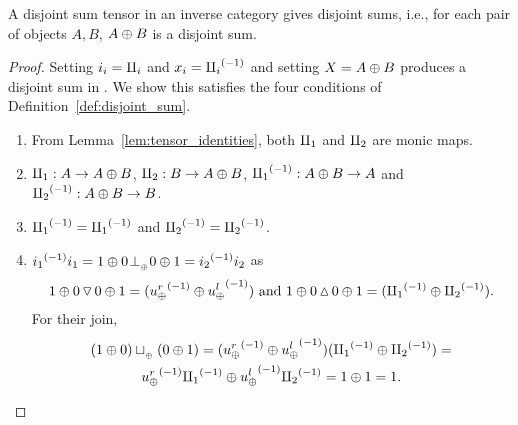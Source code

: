 \begin{proposition}\label{prop:a_disjoint_sum_tensor_gives_disjoint_sums}
  A disjoint sum tensor in an inverse category \X gives disjoint sums, i.e., for each pair of
  objects $A,B$, $A\oplus B$ is a disjoint sum.
\end{proposition}
\begin{proof}
  Setting $i_i = \amalg_{i}$ and $x_i = {\amalg_{i}}^{(-1)}$ and setting $X = A\oplus B$ produces a disjoint
  sum in \X. We show this satisfies the four conditions of Definition~\ref{def:disjoint_sum}.
  \begin{enumerate}[{(}i{)}]
    \item From Lemma~\ref{lem:tensor_identities}, both $\amalg_{1}$ and $\amalg_{2}$ are monic maps.
    \item $\amalg_{1} : A \to A\oplus B$, $\amalg_{2}: B \to A\oplus B$, ${\amalg_{1}}^{(-1)}: A\oplus B \to A$ and ${\amalg_{2}}^{(-1)}: A\oplus B \to B$.
    \item ${\amalg_{1}}^{(-1)} = {\amalg_{1}}^{(-1)}$ and ${\amalg_{2}}^{(-1)} = {\amalg_{2}}^{(-1)}$.
    \item ${i_1}^{(-1)}i_1 = 1\oplus 0 {}_{{}_{}}{\perp_{{}_{\oplus}}} 0\oplus1 = {i_2}^{(-1)}i_2$ as
      \[
        1\oplus0 \operatorname{\triangledown} 0\oplus1 = ({u_{\oplus}^r}^{(-1)}\oplus{\ensuremath{u_{\oplus}^l}}^{(-1)})\text{ and }
        1\oplus0 \operatorname{\vartriangle} 0\oplus1 = ({\amalg_{1}}^{(-1)}\oplus{\amalg_{2}}^{(-1)}).
      \]
      For their join,
      \begin{multline*}
        (1\oplus0)\sqcup_{{_{\oplus}}} (0\oplus1) = ({u_{\oplus}^r}^{(-1)}\oplus{\ensuremath{u_{\oplus}^l}}^{(-1)})({\amalg_{1}}^{(-1)}\oplus{\amalg_{2}}^{(-1)}) =\\
        {u_{\oplus}^r}^{(-1)}{\amalg_{1}}^{(-1)} \oplus {\ensuremath{u_{\oplus}^l}}^{(-1)}{\amalg_{2}}^{(-1)} = 1\oplus1 = 1.
      \end{multline*}
    \end{enumerate}
\end{proof}

